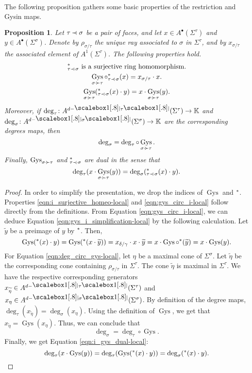 \documentclass[11pt]{amsart}
\newtheorem{prop}[thm]{Proposition}
\theoremstyle{definition}
\numberwithin{equation}{section}
\renewcommand{\~}{\widetilde}
\newcommand{\bul}{\bullet} %
\DeclareMathOperator{\gys}{Gys} %
\newcommand{\corps}{\mathbb K} %
\let\i\relax
\newcommand{\i}{{\mathop{}\mathrm{i}}} %
\newcommand{\dimsaux}[2]{\raisebox{.2ex}{\scalebox{1}[.8]{$#1\lvert$}}#2\raisebox{.2ex}{\scalebox{1}[.8]{$#1\rvert$}}}
\newcommand{\dims}[1]{\mathpalette\dimsaux{#1}}
\newcommand{\subface}{\prec}
\newcommand{\ssubface}{\mathbin{\mathchoice
  {\subface\!\!\!\cdot}%
  {\subface\!\!\!\cdot}%
  {\subface\!\cdot}%
  {\subface\!\cdot}%
}} %
\newcommand{\supface}{\succ}
\newcommand{\ssupface}{\mathbin{\mathchoice
  {\cdot\!\!\!\supface}%
  {\cdot\!\!\!\supface}%
  {\cdot\!\supface}%
  {\cdot\!\supface}%
}}
\begin{document}
The following proposition gathers some basic properties of the restriction and Gysin maps.
\begin{prop} \label{lem:i_gys_basic_properties-local}
Let $\tau\ssubface\sigma$ be a pair of faces, and let $x\in A^\bul(\Sigma^\tau)$ and $y\in A^\bul(\Sigma^\sigma)$. Denote by $\rho_{\sigma/\tau}$ the unique ray associated to $\sigma$ in $\Sigma^\tau$, and by $x_{\sigma/\tau}$ the associated element of $A^1(\Sigma^\tau)$. The following properties hold.
\begin{gather}
\text{$\i^*_{\tau\ssubface\sigma}$ is a surjective ring homomorphism.} \label{eqn:i_surjective_homeo-local} \\
\gys_{\sigma\ssupface\tau}\circ\i^*_{\tau\ssubface \sigma}(x)=x_{\sigma/\tau}\cdot x. \label{eqn:gys_circ_i-local} \\
\gys_{\sigma\ssupface\tau}(\i^*_{\tau\ssubface\sigma}(x)\cdot y)=x\cdot\gys_{\sigma \ssupface\tau}(y).  \label{eqn:gys_i_simplification-local}
\end{gather}
Moreover, if $\deg_\tau\colon A^{d-\dims\tau}(\Sigma^\tau)\to\corps$ and $\deg_\sigma\colon A^{d-\dims\sigma}(\Sigma^\sigma)\to\corps$ are the corresponding degrees maps, then
\begin{equation} \label{eqn:deg_circ_gys-local}
\deg_\sigma=\deg_\tau\circ\gys_{\sigma\ssupface\tau}.
\end{equation}
Finally, $\gys_{\sigma\ssupface\tau}$ and $\i^*_{\tau\ssubface\sigma}$ are dual in the sense that
\begin{equation} \label{eqn:i_gys_dual-local}
\deg_\tau(x\cdot\gys_{\sigma\ssupface\tau}(y))=\deg_\sigma(\i^*_{\tau\ssubface\sigma}(x)\cdot y).
\end{equation}
\end{prop}

\begin{proof} In order to simplify the presentation, we drop the indices of $\gys$ and $\i^*$. Properties \eqref{eqn:i_surjective_homeo-local} and \eqref{eqn:gys_circ_i-local} follow directly from the definitions. From Equation \eqref{eqn:gys_circ_i-local}, we can deduce Equation \eqref{eqn:gys_i_simplification-local} by the following calculation. Let $\~y$ be a preimage of $y$ by $\i^*$. Then,
\[ \gys(\i^*(x)\cdot y)=\gys(\i^*(x\cdot \~y))=x_{\delta/\gamma}\cdot x\cdot\~y=x\cdot\gys\circ\i^*(\~y)=x\cdot\gys(y). \]
For Equation \eqref{eqn:deg_circ_gys-local}, let $\eta$ be a maximal cone of $\Sigma^\sigma$. Let $\~\eta$ be the corresponding cone containing $\rho_{\sigma/\tau}$ in $\Sigma^\tau$. The cone $\~\eta$ is maximal in $\Sigma^\tau$. We have the respective corresponding generators $x_{\~\eta}\in A^{d-\dims\tau}(\Sigma^\tau)$ and $x_\eta\in A^{d-\dims\sigma}(\Sigma^\sigma)$. By definition of the  degree maps, $\deg_\tau(x_{\~\eta})=\deg_\sigma(x_\eta)$. Using the definition of $\gys$, we get that $x_{\~\eta}=\gys(x_\eta)$. Thus, we can conclude that
\[ \deg_\sigma = \deg_\tau\circ\gys. \]
Finally, we get Equation \eqref{eqn:i_gys_dual-local}:
\[ \deg_\tau(x\cdot\gys(y))=\deg_\tau(\gys(\i^*(x)\cdot y))=\deg_\sigma(\i^*(x)\cdot y). \qedhere \]
\end{proof}
\end{document}
